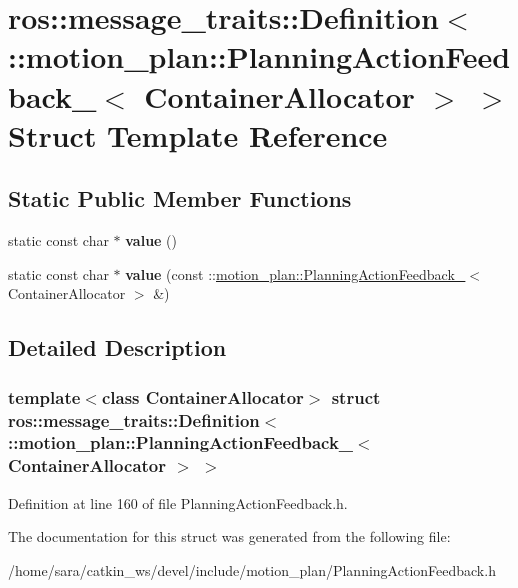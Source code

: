 \hypertarget{structros_1_1message__traits_1_1Definition_3_01_1_1motion__plan_1_1PlanningActionFeedback___3_01ContainerAllocator_01_4_01_4}{}\section{ros\+:\+:message\+\_\+traits\+:\+:Definition$<$ \+:\+:motion\+\_\+plan\+:\+:Planning\+Action\+Feedback\+\_\+$<$ Container\+Allocator $>$ $>$ Struct Template Reference}
\label{structros_1_1message__traits_1_1Definition_3_01_1_1motion__plan_1_1PlanningActionFeedback___3_01ContainerAllocator_01_4_01_4}
\subsection*{Static Public Member Functions}
\begin{DoxyCompactItemize}
\item 
\mbox{\label{structros_1_1message__traits_1_1Definition_3_01_1_1motion__plan_1_1PlanningActionFeedback___3_01ContainerAllocator_01_4_01_4_ab21aef32e81a0c148ec0b771264dcaea}} 
static const char $\ast$ {\bfseries value} ()
\item 
\mbox{\label{structros_1_1message__traits_1_1Definition_3_01_1_1motion__plan_1_1PlanningActionFeedback___3_01ContainerAllocator_01_4_01_4_a4f287e6cfaa54c4ad8c045ac1b783373}} 
static const char $\ast$ {\bfseries value} (const \+::\hyperlink{structmotion__plan_1_1PlanningActionFeedback__}{motion\+\_\+plan\+::\+Planning\+Action\+Feedback\+\_\+}$<$ Container\+Allocator $>$ \&)
\end{DoxyCompactItemize}


\subsection{Detailed Description}
\subsubsection*{template$<$class Container\+Allocator$>$\newline
struct ros\+::message\+\_\+traits\+::\+Definition$<$ \+::motion\+\_\+plan\+::\+Planning\+Action\+Feedback\+\_\+$<$ Container\+Allocator $>$ $>$}



Definition at line 160 of file Planning\+Action\+Feedback.\+h.



The documentation for this struct was generated from the following file\+:\begin{DoxyCompactItemize}
\item 
/home/sara/catkin\+\_\+ws/devel/include/motion\+\_\+plan/Planning\+Action\+Feedback.\+h\end{DoxyCompactItemize}
